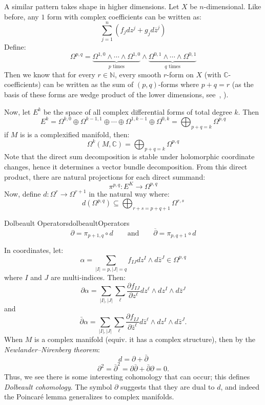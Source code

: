 \documentclass{book}
\newcommand{\C}{{\mathbb{C}}}
\newcommand{\N}{{\mathbb{N}}}
\newcommand{\sse}{\subseteq}
\begin{document}
A similar pattern takes shape in higher dimensions. Let $X$ be $n$-dimensional. Like before, any $1$ form with
complex coefficients can be written as:
\[
  \sum_{j=1}^n (f_jdz^{j} + g_jd\overline{z}^j)
\]
Define:
\[
  \Omega^{p,q} = \underbrace{\Omega^{1,0} \wedge \cdots \wedge \Omega^{1,0}}_{\text{$p$ times}}\wedge \underbrace{\Omega^{0,1} \wedge \cdots \wedge \Omega^{0,1}}_{\text{$q$ times}}
\]
Then we know that for every $r \in \N$, every smooth $r$-form on $X$ (with $\C$-coefficients) can be written
as the sum of $(p,q)$-forms where $p+q = r$ (as the basis of these forms are wedge product of the lower
dimensions, see~\cite{NateDiffGeo}, \cite{NateAlgTop}).

Now, let $E^k$ be the space of all complex differential forms of total degree $k$. Then
\[
  E^k = \Omega^{k,0} \oplus \Omega^{k-1, 1}\oplus \cdots \oplus \Omega^{1, k-1}\oplus \Omega^{0,k}
  = \bigoplus_{p+q=k} \Omega^{p,q}
\]
if $M$ is is a complexified manifold, then:
\[
  \Omega^k(M, \C) = \bigoplus_{p+q=k} \Omega^{p,q}
\]
Note that the direct sum decomposition is stable under holomorphic coordinate changes, hence it determines
a vector bundle decomposition. From this direct product, there are natural projections for each direct summand:
\[
  \pi^{p,q}: E^K \to \Omega^{p,q}
\]
Now, define $d: \Omega^r \to \Omega^{r+1}$ in the natural way where:
\[
  d(\Omega^{p,q}) \sse \bigoplus_{r+s=p+q+1} \Omega^{r,s}
\]
\begin{defn}{Dolbeault Operators}{dolbeaultOperators}
  \[
    \partial = \pi_{p+1, q}\circ d \qquad \text{and} \qquad \overline{\partial} = \pi_{p, q+1}\circ d
  \]
\end{defn}
In coordinates, let:
\[
    \alpha = \sum_{|I|=p,|J|=q} f_{IJ} dz^I \wedge d\bar{z}^J \in \Omega^{p,q}
\]
where $I$ and $J$ are multi-indices. Then:
\[
    \partial\alpha = \sum_{|I|,|J|} \sum_\ell \frac{\partial f_{IJ}}{\partial z^\ell} dz^\ell \wedge dz^I \wedge d\bar{z}^J
\]
and
\[
    \bar{\partial}\alpha = \sum_{|I|,|J|} \sum_\ell \frac{\partial f_{IJ}}{\partial\bar{z}^\ell} d\bar{z}^\ell \wedge dz^I \wedge d\bar{z}^J.
\]
When $M$ is a complex manifold (equiv. it has a complex structure), then by the \emph{Newlander–Nirenberg
theorem}:
\[
    d = \partial + \bar{\partial}
\]
\[
    \partial^2 = \bar{\partial}^2 = \partial\bar{\partial} + \bar{\partial}\partial = 0.
\]
Thus, we see there is some interesting cohomology that can occur; this defines \emph{Dolbeault cohomology}.
The symbol $\partial$ suggests that they are dual to $d$, and indeed the Poincar\'e lemma generalizes to
complex manifolds.
\end{document}
